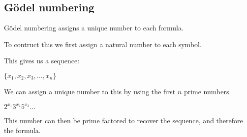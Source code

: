 
\subsection{Gödel numbering}

Gödel numbering assigns a unique number to each formula.

To contruct this we first assign a natural number to each symbol.

This gives us a sequence:

\(\{x_1, x_2, x_3,...,x_n\}\)

We can assign a unique number to this by using the first \(n\) prime numbers.

\(2^{x_1}3^{x_2}5^{x_3}...\)

This number can then be prime factored to recover the sequence, and therefore the formula.

